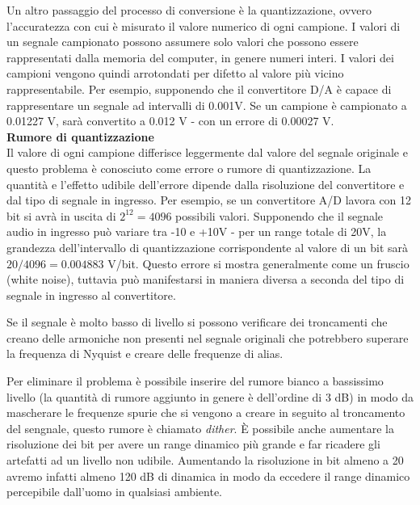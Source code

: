 \documentclass[11pt]{article}
\begin{document}
\begin{multicols*}{2}
\noindent Un altro passaggio del processo di conversione è la quantizzazione, ovvero l'accuratezza con cui è misurato il valore numerico di ogni campione. I valori di un segnale campionato possono assumere solo valori che possono essere rappresentati dalla memoria del computer, in genere numeri interi. I valori dei campioni vengono quindi arrotondati per difetto al valore più vicino rappresentabile. Per esempio, supponendo che il convertitore D/A è capace di rappresentare un segnale ad intervalli di  0.001V. Se un campione è campionato a 0.01227 V, sarà convertito a 0.012 V - con un errore di 0.00027 V. \\

\textbf{\textsf {Rumore di quantizzazione}}\\

\noindent Il valore di ogni campione differisce leggermente dal valore del segnale originale e questo problema è conosciuto come errore o rumore di quantizzazione. La quantità e l’effetto udibile dell’errore dipende dalla risoluzione del convertitore e dal tipo di segnale in ingresso. Per esempio, se un convertitore A/D lavora con 12 bit si avrà in uscita di $2^{12} = 4096$ possibili valori. Supponendo che il segnale audio in ingresso può variare tra -10 e +10V - per un range totale di 20V, la grandezza dell'intervallo di quantizzazione corrispondente al valore di un bit sarà $20/4096 = 0.004883$ V/bit.
 Questo errore si mostra generalmente come un fruscio (white noise), tuttavia può manifestarsi in maniera diversa a seconda del tipo di segnale in ingresso al convertitore.
 
 Se il segnale è molto basso di livello si possono verificare dei troncamenti che creano delle armoniche non presenti nel segnale originali che potrebbero superare la frequenza di Nyquist e creare delle frequenze di alias.

Per eliminare il problema è possibile inserire del rumore bianco a bassissimo livello (la quantità di rumore aggiunto in genere è dell'ordine di 3 dB) in modo da mascherare le frequenze spurie che si vengono a creare in seguito al troncamento del sengnale, questo rumore è chiamato \textit{dither}. È possibile anche aumentare la risoluzione dei bit per avere un range dinamico più grande e far ricadere gli artefatti ad un livello non udibile. Aumentando la risoluzione in bit almeno a 20 avremo infatti almeno 120 dB di dinamica in modo da eccedere il range dinamico percepibile dall'uomo in qualsiasi ambiente.\\


\end{multicols*}
\end{document}
